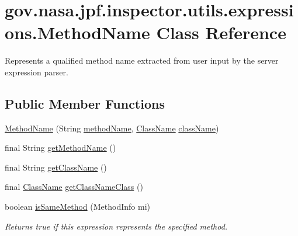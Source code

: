 \hypertarget{classgov_1_1nasa_1_1jpf_1_1inspector_1_1utils_1_1expressions_1_1_method_name}{}\section{gov.\+nasa.\+jpf.\+inspector.\+utils.\+expressions.\+Method\+Name Class Reference}
\label{classgov_1_1nasa_1_1jpf_1_1inspector_1_1utils_1_1expressions_1_1_method_name}


Represents a qualified method name extracted from user input by the server expression parser.  


\subsection*{Public Member Functions}
\begin{DoxyCompactItemize}
\item 
\hyperlink{classgov_1_1nasa_1_1jpf_1_1inspector_1_1utils_1_1expressions_1_1_method_name_a70c8ca9cd811bc58f9ba50aefa639649}{Method\+Name} (String \hyperlink{classgov_1_1nasa_1_1jpf_1_1inspector_1_1utils_1_1expressions_1_1_method_name_a2a429c9d89bbdbdad12c6cb553ff5d55}{method\+Name}, \hyperlink{classgov_1_1nasa_1_1jpf_1_1inspector_1_1utils_1_1expressions_1_1_class_name}{Class\+Name} \hyperlink{classgov_1_1nasa_1_1jpf_1_1inspector_1_1utils_1_1expressions_1_1_method_name_a1946a1f60b1c2031ac340a54a560a849}{class\+Name})
\item 
final String \hyperlink{classgov_1_1nasa_1_1jpf_1_1inspector_1_1utils_1_1expressions_1_1_method_name_a24caf0401e4ce3c8c1c8cd1f98e00ab8}{get\+Method\+Name} ()
\item 
final String \hyperlink{classgov_1_1nasa_1_1jpf_1_1inspector_1_1utils_1_1expressions_1_1_method_name_ad2bc7490c4d365bf35323f8b660219b3}{get\+Class\+Name} ()
\item 
final \hyperlink{classgov_1_1nasa_1_1jpf_1_1inspector_1_1utils_1_1expressions_1_1_class_name}{Class\+Name} \hyperlink{classgov_1_1nasa_1_1jpf_1_1inspector_1_1utils_1_1expressions_1_1_method_name_a8fda4eaa4180788cf30d53e00b67eeb9}{get\+Class\+Name\+Class} ()
\item 
boolean \hyperlink{classgov_1_1nasa_1_1jpf_1_1inspector_1_1utils_1_1expressions_1_1_method_name_a9f8ac54000a1a3321f93327beb4620a2}{is\+Same\+Method} (Method\+Info mi)
\begin{DoxyCompactList}\small\item\em Returns true if this expression represents the specified method. \end{DoxyCompactList}\end{DoxyCompactItemize}
